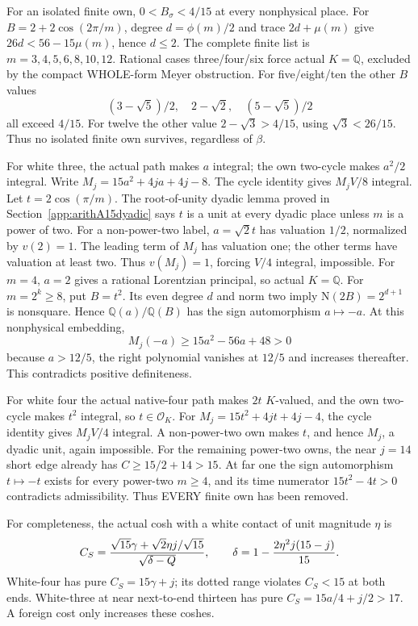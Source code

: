 \documentclass[11pt]{article}
\begin{document}
For an isolated finite own,
\(0<B_\sigma<4/15\) at every nonphysical place.
For \(B=2+2\cos(2\pi/m)\), degree \(d=\phi(m)/2\)
and trace \(2d+\mu(m)\) give
\(26d<56-15\mu(m)\), hence \(d\le2\).
The complete finite list is \(m=3,4,5,6,8,10,12\).
Rational cases three/four/six force actual \(K=\mathbb Q\),
excluded by the compact WHOLE-form Meyer obstruction.
For five/eight/ten the other \(B\) values
\[
 (3-\sqrt5)/2,\quad2-\sqrt2,\quad(5-\sqrt5)/2
\]
all exceed \(4/15\).
For twelve the other value \(2-\sqrt3>4/15\),
using \(\sqrt3<26/15\).
Thus no isolated finite own survives, regardless of \(\beta\).

For white three, the actual path makes \(a\) integral;
the own two-cycle makes \(a^2/2\) integral.
Write \(M_j=15a^2+4ja+4j-8\).
The cycle identity gives \(M_jV/8\) integral.
Let \(t=2\cos(\pi/m)\).
The root-of-unity dyadic lemma proved in
Section~\ref{app:arithA15dyadic} says \(t\) is a unit
at every dyadic place unless \(m\) is a power of two.
For a non-power-two label, \(a=\sqrt2t\) has
valuation \(1/2\), normalized by \(v(2)=1\).
The leading term of \(M_j\) has valuation one;
the other terms have valuation at least two.
Thus \(v(M_j)=1\), forcing \(V/4\) integral, impossible.
For \(m=4\), \(a=2\) gives a rational Lorentzian
principal, so actual \(K=\mathbb Q\).
For \(m=2^k\ge8\), put \(B=t^2\).
Its even degree \(d\) and norm two imply
\(\mathrm N(2B)=2^{d+1}\) is nonsquare.
Hence \(\mathbb Q(a)/\mathbb Q(B)\) has the sign
automorphism \(a\mapsto-a\).
At this nonphysical embedding,
\[
                  M_j(-a)\ge15a^2-56a+48>0
\]
because \(a>12/5\), the right polynomial vanishes
at \(12/5\) and increases thereafter.
This contradicts positive definiteness.

For white four the actual native-four path makes
\(2t\) \(K\)-valued, and the own two-cycle makes
\(t^2\) integral, so \(t\in\mathcal O_K\).
For \(M_j=15t^2+4jt+4j-4\), the cycle identity
gives \(M_jV/4\) integral.
A non-power-two own makes \(t\), and hence \(M_j\),
a dyadic unit, again impossible.
For the remaining power-two owns, the near \(j=14\)
short edge already has \(C\ge15/2+14>15\).
At far one the sign automorphism \(t\mapsto-t\)
exists for every power-two \(m\ge4\), and its time
numerator \(15t^2-4t>0\) contradicts admissibility.
Thus EVERY finite own has been removed.

For completeness, the actual cosh with a white contact
of unit magnitude \(\eta\) is
\[
 C_S={\sqrt{15}\gamma+\sqrt2\eta j/\sqrt{15}
                   \over\sqrt{\delta-Q}},\qquad
 \delta=1-{2\eta^2j(15-j)\over15}.
\]
White-four has pure \(C_S=15\gamma+j\);
its dotted range violates \(C_S<15\) at both ends.
White-three at near next-to-end thirteen has pure
\(C_S=15a/4+j/2>17\).
A foreign cost only increases these coshes.
\end{document}

